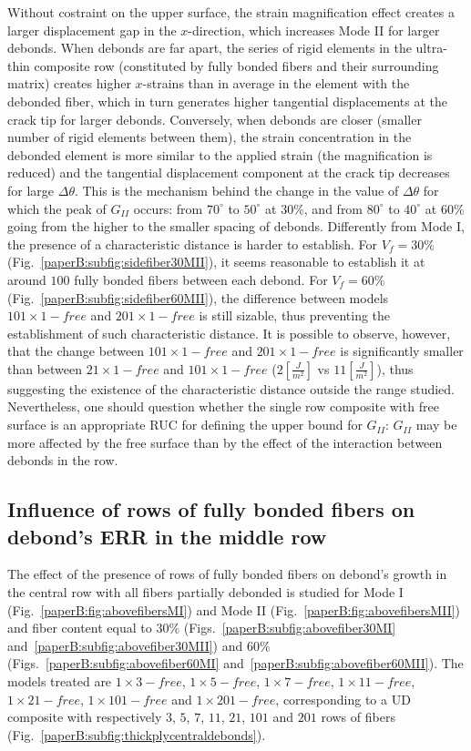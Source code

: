 Without costraint on the upper surface, the strain magnification effect creates a larger displacement gap in the $x$-direction, which increases Mode II for larger debonds. When debonds are far apart, the series of rigid elements in the ultra-thin composite row (constituted by fully bonded fibers and their surrounding matrix) creates higher $x$-strains than in average in the element with the debonded fiber, which in turn generates higher tangential displacements at the crack tip for larger debonds. Conversely, when debonds are closer (smaller number of rigid elements between them), the strain concentration in the debonded element is more similar to the applied strain (the magnification is reduced) and the tangential displacement component at the crack tip decreases for large $\Delta\theta$. This is the mechanism behind the change in the value of $\Delta\theta$ for which the peak of $G_{II}$ occurs: from $70^{\circ}$ to $50^{\circ}$ at $30\%$, and from $80^{\circ}$ to $40^{\circ}$ at $60\%$ going from the higher to the smaller spacing of debonds. Differently from Mode I, the presence of a characteristic distance is harder to establish. For $V_{f}=30\%$ (Fig.~\ref{paperB:subfig:sidefiber30MII}), it seems reasonable to establish it at around $100$ fully bonded fibers between each debond. For $V_{f}=60\%$ (Fig.~\ref{paperB:subfig:sidefiber60MII}), the difference between models $101\times 1-free$ and $201\times 1-free$ is still sizable, thus preventing the establishment of such characteristic distance. It is possible to observe, however, that the change between $101\times 1-free$ and $201\times 1-free$ is significantly smaller than between $21\times 1-free$ and $101\times 1-free$ ($2\left[\frac{J}{m^{2}}\right]$ vs $11\left[\frac{J}{m^{2}}\right]$), thus suggesting the existence of the characteristic distance outside the range studied. Nevertheless, one should question whether the single row composite with free surface is an appropriate RUC for defining the upper bound for $G_{II}$: $G_{II}$ may be more affected by the free surface than by the effect of the interaction between debonds in the row.

\subsection{Influence of rows of fully bonded fibers on debond's ERR in the middle row}\label{paperB:subsec:fiberabove}

The effect of the presence of rows of fully bonded fibers on debond's growth in the central row with all fibers partially debonded is studied for Mode I (Fig.~\ref{paperB:fig:abovefibersMI}) and Mode II (Fig.~\ref{paperB:fig:abovefibersMII}) and fiber content equal to $30\%$ (Figs.~\ref{paperB:subfig:abovefiber30MI} and~\ref{paperB:subfig:abovefiber30MII}) and $60\%$ (Figs.~\ref{paperB:subfig:abovefiber60MI} and~\ref{paperB:subfig:abovefiber60MII}). The models treated are $1\times 3-free$, $1\times 5-free$, $1\times 7-free$, $1\times 11-free$, $1\times 21-free$, $1\times 101-free$ and $1\times 201-free$, corresponding to a UD composite with respectively $3$, $5$, $7$, $11$, $21$, $101$ and $201$ rows of fibers (Fig.~\ref{paperB:subfig:thickplycentraldebonds}).

